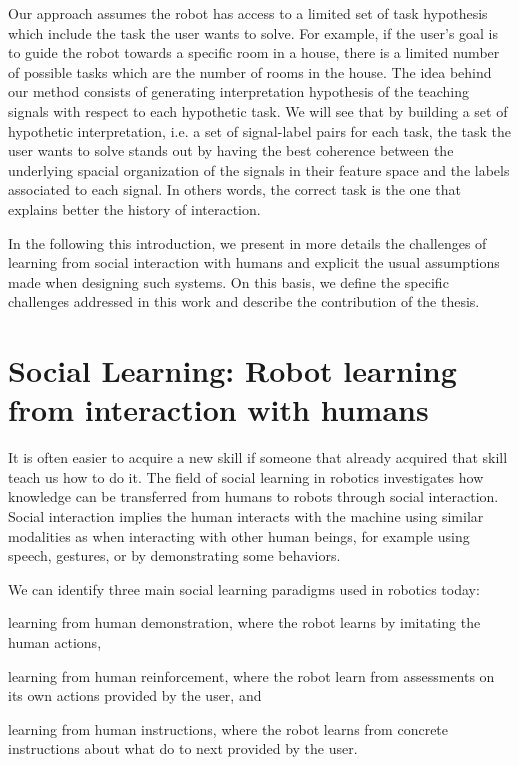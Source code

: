 Our approach assumes the robot has access to a limited set of task hypothesis which include the task the user wants to solve. For example, if the user's goal is to guide the robot towards a specific room in a house, there is a limited number of possible tasks which are the number of rooms in the house. The idea behind our method consists of generating interpretation hypothesis of the teaching signals with respect to each hypothetic task. We will see that by building a set of hypothetic interpretation, i.e. a set of signal-label pairs for each task, the task the user wants to solve stands out by having the best coherence between the underlying spacial organization of the signals in their feature space and the labels associated to each signal. In others words, the correct task is the one that explains better the history of interaction.

In the following this introduction, we present in more details the challenges of learning from social interaction with humans and explicit the usual assumptions made when designing such systems. On this basis, we define the specific challenges addressed in this work and describe the contribution of the thesis.

\section{Social Learning: Robot learning from interaction with humans}
\label{sec:intro:social}

It is often easier to acquire a new skill if someone that already acquired that skill teach us how to do it. The field of social learning in robotics investigates how knowledge can be transferred from humans to robots through social interaction. Social interaction implies the human interacts with the machine using similar modalities as when interacting with other human beings, for example using speech, gestures, or by demonstrating some behaviors. 

We can identify three main social learning paradigms used in robotics today: \begin{inparaenum}[(a)] \item learning from human demonstration, where the robot learns by imitating the human actions, \item learning from human reinforcement, where the robot learn from assessments on its own actions provided by the user, and \item learning from human instructions, where the robot learns from concrete instructions about what do to next provided by the user. \end{inparaenum}

